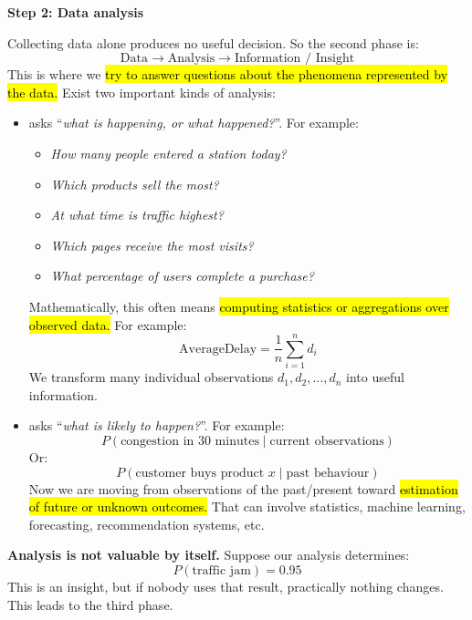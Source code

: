 \highspace
\begin{flushleft}
    \textcolor{Green3}{ \textbf{Step 2: Data analysis}}
\end{flushleft}
Collecting data alone produces no useful decision. So the second phase is:
\begin{equation*}
    \text{Data}
    \rightarrow
    \text{Analysis}
    \rightarrow
    \text{Information / Insight}
\end{equation*}
This is where we \hl{try to answer questions about the phenomena represented by the data.} Exist two important kinds of analysis:
\begin{itemize}
    \item {} asks ``\emph{what is happening, or what happened?}''. For example:
        \begin{itemize}
            \item \emph{How many people entered a station today?}
            \item \emph{Which products sell the most?}
            \item \emph{At what time is traffic highest?}
            \item \emph{Which pages receive the most visits?}
            \item \emph{What percentage of users complete a purchase?}
        \end{itemize}
        Mathematically, this often means \hl{computing statistics or aggregations over observed data.} For example:
        \begin{equation*}
            \text{AverageDelay}
            =
            \frac{1}{n}\sum_{i=1}^{n}d_i
        \end{equation*}
        We transform many individual observations $d_1,d_2,\ldots,d_n$ into useful information.

    \item {} asks ``\emph{what is likely to happen?}''. For example:
        \begin{equation*}
            P(\text{congestion in 30 minutes}\mid\text{current observations})
        \end{equation*}
        Or:
        \begin{equation*}
            P(\text{customer buys product }x\mid\text{past behaviour})
        \end{equation*}
        Now we are moving from observations of the past/present toward \hl{estimation of future or unknown outcomes.} That can involve statistics, machine learning, forecasting, recommendation systems, etc.
\end{itemize}
\textcolor{Red2}{ \textbf{Analysis is not valuable by itself.}} Suppose our analysis determines:
\begin{equation*}
    P(\text{traffic jam})=0.95
\end{equation*}
This is an insight, but if nobody uses that result, practically nothing changes. This leads to the third phase.

